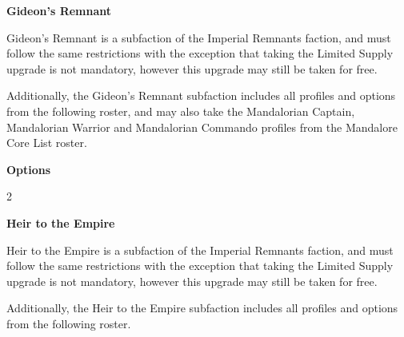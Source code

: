 \documentclass{article}
\begin{document}
\vspace{0.6cm}

{\Large \textbf{Gideon's Remnant}}
\vspace{0.3cm}

\begin{minipage}{19cm}
    Gideon's Remnant is a subfaction of the Imperial Remnants faction, and must follow the same
    restrictions with the exception that taking the Limited Supply upgrade is not mandatory,
    however this upgrade may still be taken for free.
    \vspace{0.3cm}

    Additionally, the Gideon's Remnant subfaction includes all profiles and options from the
    following roster, and may also take the Mandalorian Captain, Mandalorian Warrior and
    Mandalorian Commando profiles from the Mandalore Core List roster.
\end{minipage}

\vspace{0.3cm}
{\scriptsize
\setlength\extrarowheight{1.5pt}

}
\vspace{0.6cm}

{\large \textbf{Options}}
\vspace{0.3cm}
\begin{multicols}{2}
    {\scriptsize

    \setlength\extrarowheight{1.5pt}
    

    \vspace{0.6cm}

    \setlength\extrarowheight{1.5pt}
    

    \vspace{0.6cm}

    \setlength\extrarowheight{1.5pt}
    
    }
\end{multicols}

\vspace{0.6cm}

{\Large \textbf{Heir to the Empire}}
\vspace{0.3cm}

\begin{minipage}{19cm}
    Heir to the Empire is a subfaction of the Imperial Remnants faction, and must follow the same
    restrictions with the exception that taking the Limited Supply upgrade is not mandatory,
    however this upgrade may still be taken for free.
    \vspace{0.3cm}

    Additionally, the Heir to the Empire subfaction includes all profiles and options
    from the following roster.
\end{minipage}
\end{document}
